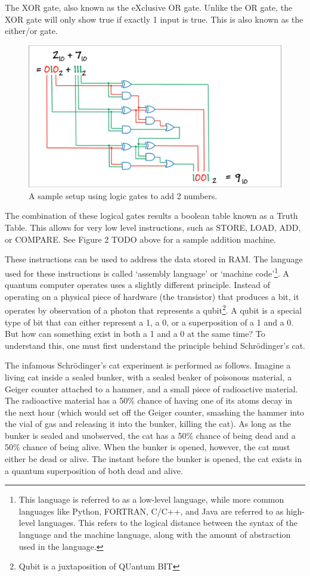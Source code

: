 \documentclass[10pt,journal,compsoc]{IEEEtran}
\begin{document}
The XOR gate, also known as the eXclusive OR gate. Unlike the OR gate, the XOR gate will only show true if exactly 1 input is true. This is also known as the either/or gate.
\begin{figure}
	\centering
	\includegraphics[width=0.7\linewidth]{adder}
	\caption{A sample setup using logic gates to add 2 numbers.}
	\label{A sample setup to add two 3 digit binary numbers.}
\end{figure}

The combination of these logical gates results a boolean table known as a Truth Table. This allows for very low level instructions, such as STORE, LOAD, ADD, or COMPARE. See Figure 2 TODO above for a sample addition machine.

These instructions can be used to address the data stored in RAM. The language used for these instructions is called `assembly language' or `machine code'\footnote{This language is referred to as a low-level language, while more common languages like Python, FORTRAN, C/C++, and Java are referred to as high-level languages. This refers to the logical distance between the syntax of the language and the machine language, along with the amount of abstraction used in the language.}.
A quantum computer operates uses a slightly different principle. Instead of operating on a physical piece of hardware (the transistor) that produces a bit, it operates by observation of a photon that represents a qubit\footnote{Qubit is a juxtaposition of QUantum BIT}. A qubit is a special type of bit that can either represent a 1, a 0, or a superposition of a 1 and a 0. But how can something exist in both a 1 and a 0 at the same time? To understand this, one must first understand the principle behind Schr\"{o}dinger’s cat. 


The infamous Schr\"{o}dinger's cat experiment is performed as follows. Imagine a living cat inside a sealed bunker, with a sealed beaker of poisonous material, a Geiger counter attached to a hammer, and a small piece of radioactive material. The radioactive material has a 50\% chance of having one of its atoms decay in the next hour (which would set off the Geiger counter, smashing the hammer into the vial of gas and releasing it into the bunker, killing the cat). As long as the bunker is sealed and unobserved, the cat has a 50\% chance of being dead and a 50\% chance of being alive. When the bunker is opened, however, the cat must either be dead or alive. The instant before the bunker is opened, the cat exists in a quantum superposition of both dead and alive. 
\end{document}
